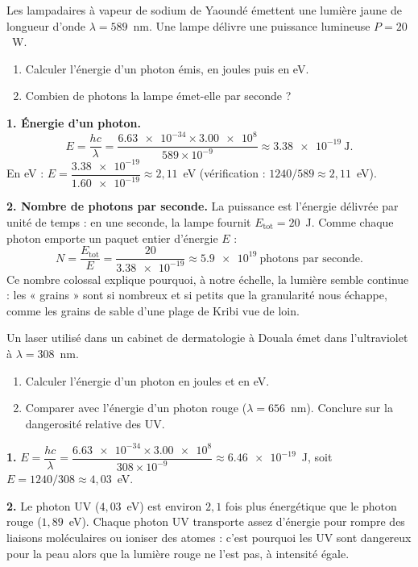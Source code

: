 \documentclass[11pt]{article}
\begin{document}
\begin{exoresolu}
Les lampadaires à vapeur de sodium de Yaoundé émettent une lumière jaune de longueur d'onde $\lambda = 589$~nm. Une lampe délivre une puissance lumineuse $P = 20$~W.
\begin{enumerate}
\item Calculer l'énergie d'un photon émis, en joules puis en eV.
\item Combien de photons la lampe émet-elle par seconde ?
\end{enumerate}
\tcblower
\textbf{1. Énergie d'un photon.}
\[ E = \frac{hc}{\lambda} = \frac{\num{6,63e-34} \times \num{3,00e8}}{589 \times 10^{-9}} \approx \num{3,38e-19}~\text{J}. \]
En eV : $E = \dfrac{\num{3,38e-19}}{\num{1,60e-19}} \approx 2,11$~eV (vérification : $1240/589 \approx 2,11$~eV).

\textbf{2. Nombre de photons par seconde.} La puissance est l'énergie délivrée par unité de temps : en une seconde, la lampe fournit $E_{\text{tot}} = 20$~J. Comme chaque photon emporte un paquet entier d'énergie $E$ :
\[ N = \frac{E_{\text{tot}}}{E} = \frac{20}{\num{3,38e-19}} \approx \num{5,9e19}~\text{photons par seconde}. \]
Ce nombre colossal explique pourquoi, à notre échelle, la lumière semble continue : les « grains » sont si nombreux et si petits que la granularité nous échappe, comme les grains de sable d'une plage de Kribi vue de loin.
\end{exoresolu}

\begin{exercice}
Un laser utilisé dans un cabinet de dermatologie à Douala émet dans l'ultraviolet à $\lambda = 308$~nm.
\begin{enumerate}
\item Calculer l'énergie d'un photon en joules et en eV.
\item Comparer avec l'énergie d'un photon rouge ($\lambda = 656$~nm). Conclure sur la dangerosité relative des UV.
\end{enumerate}
\end{exercice}

\begin{corrige}
\textbf{1.} $E = \dfrac{hc}{\lambda} = \dfrac{\num{6,63e-34} \times \num{3,00e8}}{308 \times 10^{-9}} \approx \num{6,46e-19}$~J, soit $E = 1240/308 \approx 4,03$~eV.

\textbf{2.} Le photon UV ($4,03$~eV) est environ $2,1$ fois plus énergétique que le photon rouge ($1,89$~eV). Chaque photon UV transporte assez d'énergie pour rompre des liaisons moléculaires ou ioniser des atomes : c'est pourquoi les UV sont dangereux pour la peau alors que la lumière rouge ne l'est pas, à intensité égale.
\end{corrige}
\end{document}

